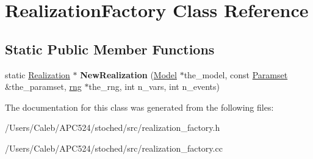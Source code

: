 \hypertarget{class_realization_factory}{}\section{Realization\+Factory Class Reference}
\label{class_realization_factory}
\subsection*{Static Public Member Functions}
\begin{DoxyCompactItemize}
\item 
\mbox{\label{class_realization_factory_a4881816e453d1107de053ea3c0b8d8ba}} 
static \hyperlink{class_realization}{Realization} $\ast$ {\bfseries New\+Realization} (\hyperlink{class_model}{Model} $\ast$the\+\_\+model, const \hyperlink{class_paramset}{Paramset} \&the\+\_\+paramset, \hyperlink{classrng}{rng} $\ast$the\+\_\+rng, int n\+\_\+vars, int n\+\_\+events)
\end{DoxyCompactItemize}


The documentation for this class was generated from the following files\+:\begin{DoxyCompactItemize}
\item 
/\+Users/\+Caleb/\+A\+P\+C524/stoched/src/realization\+\_\+factory.\+h\item 
/\+Users/\+Caleb/\+A\+P\+C524/stoched/src/realization\+\_\+factory.\+cc\end{DoxyCompactItemize}
